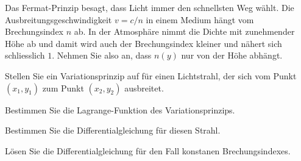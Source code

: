 Das Fermat-Prinzip besagt, dass Licht immer den schnellsten Weg wählt.
Die Ausbreitungsgeschwindigkeit $v=c/n$ in einem Medium hängt vom
Brechungsindex $n$ ab.
In der Atmosphäre nimmt die Dichte mit zunehmender Höhe ab und damit
wird auch der Brechungsindex kleiner und nähert sich schliesslich $1$.
Nehmen Sie also an, dass $n(y)$ nur von der Höhe abhängt.
\begin{teilaufgaben}
\item
Stellen Sie ein Variationsprinzip auf für einen Lichtstrahl, der sich
vom Punkt $(x_1,y_1)$ zum Punkt $(x_2,y_2)$ ausbreitet.
\item
Bestimmen Sie die Lagrange-Funktion des Variationsprinzips.
\item
Bestimmen Sie die Differentialgleichung für diesen Strahl.
\item 
Lösen Sie die Differentialgleichung für den Fall konstanen Brechungsindexes.
\end{teilaufgaben}


